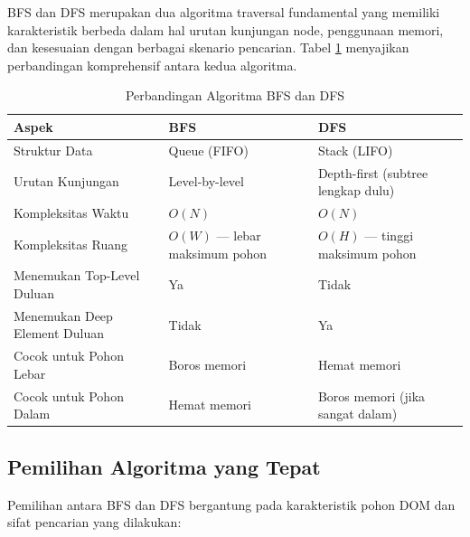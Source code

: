 BFS dan DFS merupakan dua algoritma traversal fundamental yang memiliki
karakteristik berbeda dalam hal urutan kunjungan node, penggunaan memori, dan
kesesuaian dengan berbagai skenario pencarian. Tabel \ref{tab:bfs-dfs-comparison}
menyajikan perbandingan komprehensif antara kedua algoritma.

\begin{table}[H]
\centering
\caption{Perbandingan Algoritma BFS dan DFS}
\label{tab:bfs-dfs-comparison}
\begin{tabular}{|p{4cm}|p{5cm}|p{5cm}|}
\hline
\textbf{Aspek} & \textbf{BFS} & \textbf{DFS} \\
\hline
Struktur Data & Queue (FIFO) & Stack (LIFO) \\
\hline
Urutan Kunjungan & Level-by-level & Depth-first (subtree lengkap dulu) \\
\hline
Kompleksitas Waktu & $O(N)$ & $O(N)$ \\
\hline
Kompleksitas Ruang & $O(W)$ --- lebar maksimum pohon & $O(H)$ --- tinggi maksimum pohon \\
\hline
Menemukan Top-Level Duluan & Ya & Tidak \\
\hline
Menemukan Deep Element Duluan & Tidak & Ya \\
\hline
Cocok untuk Pohon Lebar & Boros memori & Hemat memori \\
\hline
Cocok untuk Pohon Dalam & Hemat memori & Boros memori (jika sangat dalam) \\
\hline
\end{tabular}
\end{table}

\subsection{Pemilihan Algoritma yang Tepat}

Pemilihan antara BFS dan DFS bergantung pada karakteristik pohon DOM dan sifat
pencarian yang dilakukan:


